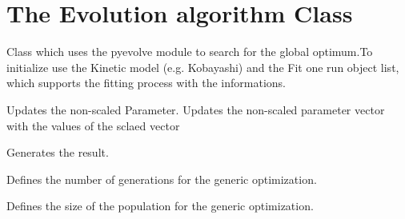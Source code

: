 \documentclass[letterpaper,10pt,english]{sphinxmanual}
\begin{document}
\section{The Evolution algorithm  Class}
\label{FittingClasses:the-evolution-algorithm-class}

\begin{fulllineitems}
\label{FittingClasses:Evolve.GenericOpt}
Class which uses the pyevolve module to search for the global optimum.To initialize use the Kinetic model (e.g. Kobayashi) and the Fit one run object list, which supports the fitting process with the informations.

\begin{fulllineitems}
\label{FittingClasses:Evolve.GenericOpt._GenericOpt__UpdateParam}
Updates the non-scaled Parameter. Updates the non-scaled parameter vector with the values of the sclaed vector

\end{fulllineitems}


\begin{fulllineitems}
\label{FittingClasses:Evolve.GenericOpt.mkResults}
Generates the result.

\end{fulllineitems}


\begin{fulllineitems}
\label{FittingClasses:Evolve.GenericOpt.setNrGenerations}
Defines the number of generations for the generic optimization.

\end{fulllineitems}


\begin{fulllineitems}
\label{FittingClasses:Evolve.GenericOpt.setNrPopulation}
Defines the size of the population for the generic optimization.


\end{fulllineitems}
\end{fulllineitems}
\end{document}
